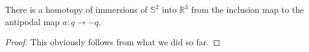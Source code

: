 %

\begin{theorem}[Smale 1958]
  \label{thm:sphere_eversion}
  \leanok
  There is a homotopy of immersions of $\mathbb{S}^2$ into $\mathbb{R}^3$ from the inclusion map to
  the antipodal map $a : q \rightarrow -q$.
\end{theorem}
  
\begin{proof}
  \leanok
  This obviously follows from what we did so far.
\end{proof}